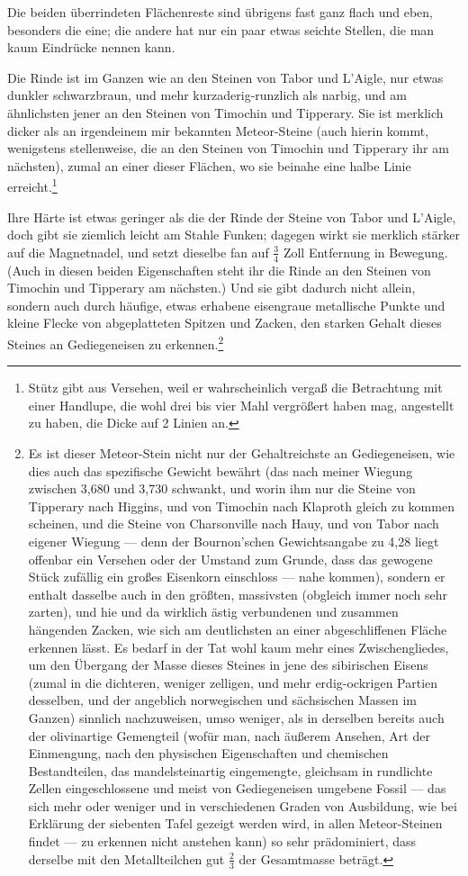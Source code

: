 \documentclass[a4paper, 11pt, oneside, german]{article}
\begin{document}
Die beiden überrindeten Flächenreste sind übrigens fast ganz flach und eben, besonders die eine; die andere hat nur ein paar etwas seichte Stellen, die man kaum Eindrücke nennen kann.

Die Rinde ist im Ganzen wie an den Steinen von Tabor und L'Aigle, nur etwas dunkler schwarzbraun, und mehr kurzaderig-runzlich als narbig, und am ähnlichsten jener an den Steinen von Timochin und Tipperary. Sie ist merklich dicker als an irgendeinem mir bekannten Meteor-Steine (auch hierin kommt, wenigstens stellenweise, die an den Steinen von Timochin und Tipperary ihr am nächsten), zumal an einer dieser Flächen, wo sie beinahe eine halbe Linie erreicht.\footnote{Stütz gibt aus Versehen, weil er wahrscheinlich vergaß die Betrachtung mit einer Handlupe, die wohl drei bis vier Mahl vergrößert haben mag, angestellt zu haben, die Dicke auf 2 Linien an.}

Ihre Härte ist etwas geringer als die der Rinde der Steine von Tabor und L'Aigle, doch gibt sie ziemlich leicht am Stahle Funken; dagegen wirkt sie merklich stärker auf die Magnetnadel, und setzt dieselbe fan auf $\frac{3}{4}$ Zoll Entfernung in Bewegung. (Auch in diesen beiden Eigenschaften steht ihr die Rinde an den Steinen von Timochin und Tipperary am nächsten.) Und sie gibt dadurch nicht allein, sondern auch durch häufige, etwas erhabene eisengraue metallische Punkte und kleine Flecke von abgeplatteten Spitzen und Zacken, den starken Gehalt dieses Steines an Gediegeneisen zu erkennen.\footnote{Es ist dieser Meteor-Stein nicht nur der Gehaltreichste an Gediegeneisen, wie dies auch das spezifische Gewicht bewährt (das nach meiner Wiegung zwischen 3,680 und 3,730 schwankt, und worin ihm nur die Steine von Tipperary nach Higgins, und von Timochin nach Klaproth gleich zu kommen scheinen, und die Steine von Charsonville nach Hauy, und von Tabor nach eigener Wiegung --- denn der Bournon'schen Gewichtsangabe zu 4,28 liegt offenbar ein Versehen oder der Umstand zum Grunde, dass das gewogene Stück zufällig ein großes Eisenkorn einschloss --- nahe kommen), sondern er enthalt dasselbe auch in den größten, massivsten (obgleich immer noch sehr zarten), und hie und da wirklich ästig verbundenen und zusammen hängenden Zacken, wie sich am deutlichsten an einer abgeschliffenen Fläche erkennen lässt. Es bedarf in der Tat wohl kaum mehr eines Zwischengliedes, um den Übergang der Masse dieses Steines in jene des sibirischen Eisens (zumal in die dichteren, weniger zelligen, und mehr erdig-ockrigen Partien desselben, und der angeblich norwegischen und sächsischen Massen im Ganzen) sinnlich nachzuweisen, umso weniger, als in derselben bereits auch der olivinartige Gemengteil (wofür man, nach äußerem Ansehen, Art der Einmengung, nach den physischen Eigenschaften und chemischen Bestandteilen, das mandelsteinartig eingemengte, gleichsam in rundlichte Zellen eingeschlossene und meist von Gediegeneisen umgebene Fossil --- das sich mehr oder weniger und in verschiedenen Graden von Ausbildung, wie bei Erklärung der siebenten Tafel gezeigt werden wird, in allen Meteor-Steinen findet --- zu erkennen nicht anstehen kann) so sehr prädominiert, dass derselbe mit den Metallteilchen gut $\frac{2}{3}$ der Gesamtmasse beträgt.} 
\end{document}
